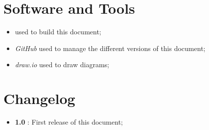 \section{Software and Tools}
\begin{itemize}
  \item \text{\LaTeX} used to build this document;
  \item \textit{GitHub} used to manage the different versions of this document;
  \item \textit{draw.io} used to draw diagrams;
\end{itemize}


\section{Changelog} \label{Changelog}
\begin{itemize}
  \item \textbf{1.0} : First release of this document;
\end{itemize}
